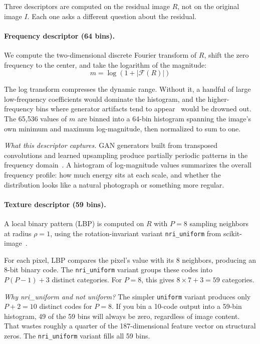 \documentclass[runningheads]{llncs}
\begin{document}
Three descriptors are computed on the residual image $R$, not on the original image $I$. Each one asks a different question about the residual.

\paragraph{Frequency descriptor (64 bins).} We compute the two-dimensional discrete Fourier transform of $R$, shift the zero frequency to the center, and take the logarithm of the magnitude:
\begin{equation}
m = \log(1 + |\mathcal{F}(R)|)
\label{eq:fft}
\end{equation}

The log transform compresses the dynamic range. Without it, a handful of large low-frequency coefficients would dominate the histogram, and the higher-frequency bins where generator artifacts tend to appear~\cite{zhang2019} would be drowned out. The 65,536 values of $m$ are binned into a 64-bin histogram spanning the image's own minimum and maximum log-magnitude, then normalized to sum to one.

\textit{What this descriptor captures.} GAN generators built from transposed convolutions and learned upsampling produce partially periodic patterns in the frequency domain~\cite{zhang2019, tan2024}. A histogram of log-magnitude values summarizes the overall frequency profile: how much energy sits at each scale, and whether the distribution looks like a natural photograph or something more regular.

\paragraph{Texture descriptor (59 bins).} A local binary pattern (LBP) is computed on $R$ with $P = 8$ sampling neighbors at radius $\rho = 1$, using the rotation-invariant variant \texttt{nri\_uniform} from scikit-image~\cite{ojala2002}.

For each pixel, LBP compares the pixel's value with its 8 neighbors, producing an 8-bit binary code. The \texttt{nri\_uniform} variant groups these codes into $P(P-1) + 3$ distinct categories. For $P = 8$, this gives $8 \times 7 + 3 = 59$ categories.

\textit{Why nri\_uniform and not uniform?} The simpler \texttt{uniform} variant produces only $P + 2 = 10$ distinct codes for $P = 8$. If you bin a 10-code output into a 59-bin histogram, 49 of the 59 bins will always be zero, regardless of image content. That wastes roughly a quarter of the 187-dimensional feature vector on structural zeros. The \texttt{nri\_uniform} variant fills all 59 bins.
\end{document}
